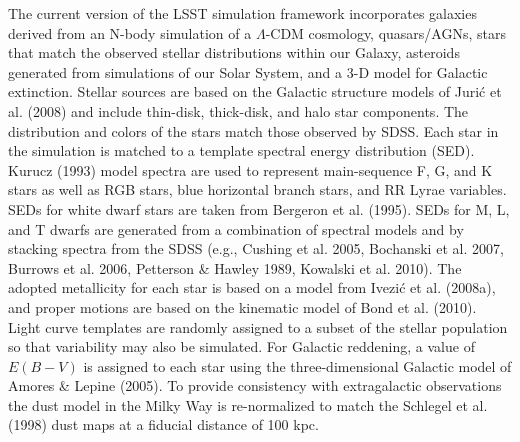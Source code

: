 \documentclass{emulateapj}
\begin{document}
{The current version of the LSST simulation framework incorporates
galaxies derived from an N-body simulation of a $\Lambda$-CDM
cosmology, quasars/AGNs, stars that match the observed stellar
distributions within our Galaxy, asteroids generated from simulations
of our Solar System, and a 3-D model for Galactic extinction.  Stellar
sources are based on the Galactic structure models of Juri\'{c} et
al. (2008) and include thin-disk, thick-disk, and halo star
components. The distribution and colors of the stars match those
observed by SDSS. Each star in the simulation is matched to a template
spectral energy distribution (SED). Kurucz (1993) model spectra are
used to represent main-sequence F, G, and K stars as well as RGB
stars, blue horizontal branch stars, and RR Lyrae variables.  SEDs for
white dwarf stars are taken from Bergeron et al. (1995).  SEDs for M,
L, and T dwarfs are generated from a combination of spectral models
and by stacking spectra from the SDSS (e.g., Cushing et al. 2005,
Bochanski et al. 2007, Burrows et al. 2006, Petterson \& Hawley 1989,
Kowalski et al. 2010). The adopted metallicity for each star is based
on a model from Ivezi\'{c} et al. (2008a), and proper motions are
based on the kinematic model of Bond et al. (2010).  Light curve
templates are randomly assigned to a subset of the stellar population
so that variability may also be simulated. For Galactic reddening, a
value of $E(B-V)$ is assigned to each star using the three-dimensional
Galactic model of Amores \& Lepine (2005). To provide consistency with
extragalactic observations the dust model in the Milky Way is
re-normalized to match the Schlegel et al. (1998) dust maps at a
fiducial distance of 100 kpc.

}
\end{document}
